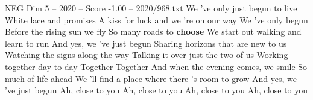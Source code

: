 \begin{textsample}{NEG Dim 5 – 2020 – Score -1.00 – 2020/968.txt}  \label{ex:f5_neg_025}
We 've only just begun to live White lace and promises A kiss for luck and we 're on our way We 've only begun Before the rising sun we fly So many roads to \textbf{choose} We start out walking and learn to run And yes, we 've just begun Sharing horizons that are new to us Watching the signs along the way Talking it over just the two of us Working together day to day Together Together And when the evening comes, we smile So much of life ahead We 'll find a place where there 's room to grow And yes, we 've just begun Ah, close to you Ah, close to you Ah, close to you Ah, close to you

\end{textsample}
